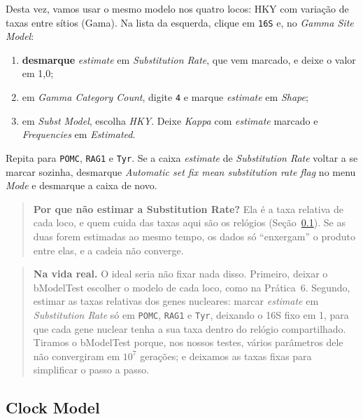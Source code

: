 \documentclass[11pt,a4paper]{article}
\newcommand{\ui}[1]{\textit{#1}}
\begin{document}
Desta vez, vamos usar o mesmo modelo nos quatro locos: HKY com variação de taxas entre sítios
(Gama). Na lista da esquerda, clique em \verb|16S| e, no \ui{Gamma Site Model}:
\begin{enumerate}
\item \textbf{desmarque} \ui{estimate} em \ui{Substitution Rate}, que vem marcado, e deixe o
valor em 1,0;
\item em \ui{Gamma Category Count}, digite \verb|4| e marque \ui{estimate} em \ui{Shape};
\item em \ui{Subst Model}, escolha \ui{HKY}. Deixe \ui{Kappa} com \ui{estimate} marcado e
\ui{Frequencies} em \ui{Estimated}.
\end{enumerate}
Repita para \verb|POMC|, \verb|RAG1| e \verb|Tyr|. Se a caixa \ui{estimate} de
\ui{Substitution Rate} voltar a se marcar sozinha, desmarque \ui{Automatic set fix mean
substitution rate flag} no menu \ui{Mode} e desmarque a caixa de novo.

\begin{quote}\small
\textbf{Por que não estimar a Substitution Rate?} Ela é a taxa relativa de cada loco, e quem
cuida das taxas aqui são os relógios (Seção~\ref{sec:clock}). Se as duas forem estimadas ao mesmo
tempo, os dados só ``enxergam'' o produto entre elas, e a cadeia não converge.
\end{quote}

\begin{quote}\small
\textbf{Na vida real.} O ideal seria não fixar nada disso. Primeiro, deixar o bModelTest
\cite{bouckaert2017} escolher o modelo de cada loco, como na Prática~6. Segundo, estimar as
taxas relativas dos genes nucleares: marcar \ui{estimate} em \ui{Substitution Rate} só em
\verb|POMC|, \verb|RAG1| e \verb|Tyr|, deixando o 16S fixo em 1, para que cada gene nuclear tenha a
sua taxa dentro do relógio compartilhado. Tiramos o bModelTest porque, nos nossos testes, vários
parâmetros dele não convergiram em $10^7$ gerações; e deixamos as taxas fixas para simplificar
o passo a passo.
\end{quote}

\subsection{Clock Model}\label{sec:clock}
\end{document}
